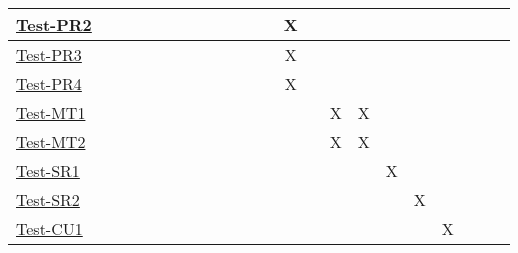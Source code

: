 \documentclass[12pt, titlepage]{article}
\begin{document}
\begin{landscape}
\begin{table}[H]
\begin{adjustwidth}{-0.3in}{-0.5in}
{\begin{tabular}{c|c|c|c|c|c|c|c|c|c|c|c|c|c|c|c|c|c|c|c|c|c|}
\multicolumn{1}{|l|}{\hyperref[itm:Test-PR2]{Test-PR2}}   &              &              &              &              &              &             &             &             &             &             &             &    X         &              &              &            &      &   &&&&     \\ \hline
\multicolumn{1}{|l|}{\hyperref[itm:Test-PR3]{Test-PR3}}   &             &             &              &             &             &             &            &             &              &              &              &      X        &             &             &             &     &   &&&&      \\ \hline
\multicolumn{1}{|l|}{\hyperref[itm:Test-PR4]{Test-PR4}}   &             &             &              &             &             &             &            &             &              &              &              &      X        &             &             &             &     &   &&&&      \\ \hline
\multicolumn{1}{|l|}{\hyperref[itm:Test-MT1]{Test-MT1}}   &             &             &             &             &             &              &             &             &              &              &              &             &              &      X       &      X      &         &&&&&     \\ \hline
\multicolumn{1}{|l|}{\hyperref[itm:Test-MT2]{Test-MT2}}   &             &             &             &             &             &              &             &             &              &              &              &             &              &       X      &       X      &         &&&&&     \\ \hline
\multicolumn{1}{|l|}{\hyperref[itm:Test-SR1]{Test-SR1}}   &             &             &             &             &             &              &             &             &              &              &              &             &              &             &             &    X     &&&&&     \\ \hline
\multicolumn{1}{|l|}{\hyperref[itm:Test-SR2]{Test-SR2}}   &             &             &             &             &             &              &             &             &              &              &              &             &              &             &             &         &X&&&&     \\ \hline
\multicolumn{1}{|l|}{\hyperref[itm:Test-CU1]{Test-CU1}}   &             &             &             &             &             &              &             &             &              &              &              &             &              &             &             &         &&X&&&     \\ \hline

\end{tabular}}
\end{adjustwidth}
\end{table}
\end{landscape}
\end{document}
